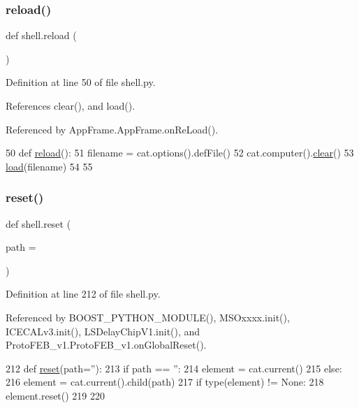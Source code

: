 \subsubsection{\texorpdfstring{reload()}{reload()}}
{\footnotesize\ttfamily def shell.\+reload (\begin{DoxyParamCaption}{ }\end{DoxyParamCaption})}



Definition at line 50 of file shell.\+py.



References clear(), and load().



Referenced by App\+Frame.\+App\+Frame.\+on\+Re\+Load().


\begin{DoxyCode}
50 \textcolor{keyword}{def }\hyperlink{namespaceshell_a406c1a03890c85fe979d6d8e540b3bdf}{reload}():
51   filename = cat.options().defFile()
52   cat.computer().\hyperlink{namespaceshell_a14da1173b3cc5b8569cc0020130e3bd7}{clear}()
53   \hyperlink{namespaceshell_af9ea9dab4000d08fadcd5fed31b64911}{load}(filename)
54 
55 
\end{DoxyCode}
\mbox{\label{namespaceshell_a2f31bbe4baf894f4863c4d392239ab8b}} 
\subsubsection{\texorpdfstring{reset()}{reset()}}
{\footnotesize\ttfamily def shell.\+reset (\begin{DoxyParamCaption}\item[{}]{path = {\ttfamily \textquotesingle{}\textquotesingle{}} }\end{DoxyParamCaption})}



Definition at line 212 of file shell.\+py.



Referenced by B\+O\+O\+S\+T\+\_\+\+P\+Y\+T\+H\+O\+N\+\_\+\+M\+O\+D\+U\+L\+E(), M\+S\+Oxxxx.\+init(), I\+C\+E\+C\+A\+Lv3.\+init(), L\+S\+Delay\+Chip\+V1.\+init(), and Proto\+F\+E\+B\+\_\+v1.\+Proto\+F\+E\+B\+\_\+v1.\+on\+Global\+Reset().


\begin{DoxyCode}
212 \textcolor{keyword}{def }\hyperlink{namespaceshell_a2f31bbe4baf894f4863c4d392239ab8b}{reset}(path=''):
213   \textcolor{keywordflow}{if} path == \textcolor{stringliteral}{''}:
214     element = cat.current()
215   \textcolor{keywordflow}{else}:
216     element = cat.current().child(path)
217   \textcolor{keywordflow}{if} type(element) != \textcolor{keywordtype}{None}:
218     element.reset()
219 
220 
\end{DoxyCode}
\mbox{\label{namespaceshell_ac89ea08a5e75ecb222fe9e707b3ee102}} 
